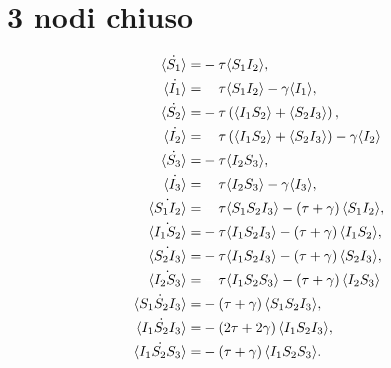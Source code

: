 \documentclass{report}
\begin{document}
\section{3 nodi chiuso}
\begin{equation*}
\begin{aligned}
\dot{\angol {S_1}} = & -\tau \angol{ S_1 I_2}, \\
	\dot{\angol {I_1}} = & \spa \tau \angol{S_1 I_2}-\gamma \angol{I_1}, \\
	\dot{\angol {S_2}} = & -\tau \tonde{ \angol{ I_1 S_2} + \angol{S_2I_3}},	\\
	\dot{\angol {I_2}} = &\spa \tau \tonde{ \angol{ I_1 S_2} + \angol{S_2I_3}}-\gamma \angol{I_2}\\
	\dot{\angol {S_3}} = & -\tau \angol{ I_2 S_3},\\	\dot{\angol {I_3}} = & \spa \tau \angol{ I_2 S_3}-\gamma \angol{I_3},\\
 	\dot{\angol{S_1I_2}}=&\spa\tau\angol{S_1S_2I_3} - \tonde{ \tau + \gamma}\angol{S_1 I_2},
\\
	\dot{\angol{I_1S_2}}=&-\tau\angol{I_1S_2I_3} - \tonde{ \tau + \gamma}\angol{I_1 S_2},
\\
	\dot{\angol{S_2I_3}}=&-\tau\angol{I_1S_2I_3} - \tonde{ \tau + \gamma}\angol{S_2 I_3},
\\
	\dot{\angol{I_2S_3}}=&\spa\tau\angol{I_1S_2S_3} - \tonde{ \tau + \gamma}\angol{I_2 S_3}\\
	\dot{\angol{S_1S_2I_3}}=&-\tonde{\tau + \gamma}\angol{S_1S_2I_3},\\
	\dot{\angol{I_1S_2I_3}}=&-\tonde{2\tau + 2\gamma}\angol{I_1S_2I_3},\\
	\dot{\angol{I_1S_2S_3}}=&-\tonde{\tau + \gamma}\angol{I_1S_2S_3}.
\end{aligned}
\end{equation*}

\newpage
\end{document}
